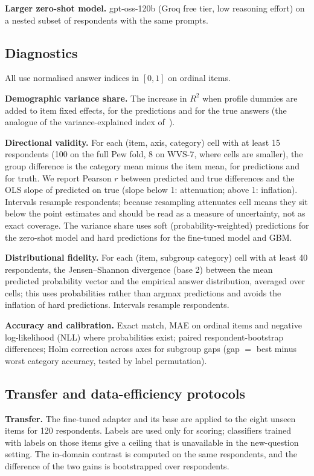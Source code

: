 \documentclass[conference]{IEEEtran}
\begin{document}
\textbf{Larger zero-shot model.} gpt-oss-120b \cite{gptoss2025} (Groq free tier, low reasoning effort) on a nested subset of respondents with the same prompts.

\subsection{Diagnostics}

All use normalised answer indices in $[0,1]$ on ordinal items.

\textbf{Demographic variance share.} The increase in $R^2$ when profile dummies are added to item fixed effects, for the predictions and for the true answers (the analogue of the variance-explained index of~\cite{chen2026}).

\textbf{Directional validity.} For each (item, axis, category) cell with at least 15 respondents (100 on the full Pew fold, 8 on WVS-7, where cells are smaller), the group difference is the category mean minus the item mean, for predictions and for truth. We report Pearson $r$ between predicted and true differences and the OLS slope of predicted on true (slope below 1: attenuation; above 1: inflation). Intervals resample respondents; because resampling attenuates cell means they sit below the point estimates and should be read as a measure of uncertainty, not as exact coverage. The variance share uses soft (probability-weighted) predictions for the zero-shot model and hard predictions for the fine-tuned model and GBM.

\textbf{Distributional fidelity.} For each (item, subgroup category) cell with at least 40 respondents, the Jensen--Shannon divergence (base 2) between the mean predicted probability vector and the empirical answer distribution, averaged over cells; this uses probabilities rather than argmax predictions and avoids the inflation of hard predictions. Intervals resample respondents.

\textbf{Accuracy and calibration.} Exact match, MAE on ordinal items and negative log-likelihood (NLL) where probabilities exist; paired respondent-bootstrap differences; Holm correction across axes for subgroup gaps (gap $=$ best minus worst category accuracy, tested by label permutation).

\subsection{Transfer and data-efficiency protocols}

\textbf{Transfer.} The fine-tuned adapter and its base are applied to the eight unseen items for 120 respondents. Labels are used only for scoring; classifiers trained with labels on those items give a ceiling that is unavailable in the new-question setting. The in-domain contrast is computed on the same respondents, and the difference of the two gains is bootstrapped over respondents.
\end{document}

